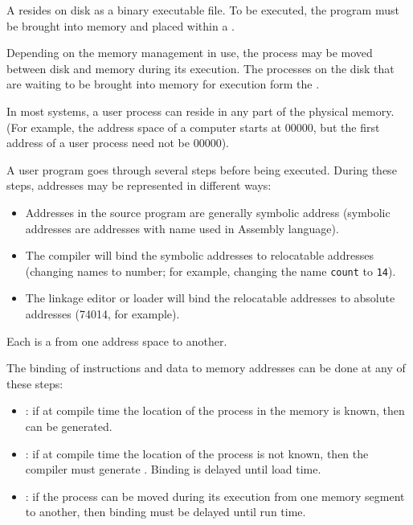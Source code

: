     \par A  resides on disk as a binary executable file. To be executed, the program must be brought into memory and placed within a .
    \par Depending on the memory management in use, the process may be moved between disk and memory during its execution. The processes on the disk that are waiting to be brought into memory for execution form the .
    \par In most systems, a user process can reside in any part of the physical memory. (For example, the address space of a computer starts at 00000, but the first address of a user process need not be 00000).
    \par A user program goes through several steps before being executed. During these steps, addresses may be represented in different ways:
    \begin{itemize}
      \item Addresses in the source program are generally symbolic address (symbolic addresses are addresses with name used in Assembly language).
      \item The compiler will bind the symbolic addresses to relocatable addresses (changing names to number; for example, changing the name \texttt{count} to \texttt{14}).
      \item The linkage editor or loader will bind the relocatable addresses to absolute addresses (74014, for example).
    \end{itemize}
    \par Each  is a  from one address space to another.
    \par The binding of instructions and data to memory addresses can be done at any of these steps:
    \begin{itemize}
      \item {}: if at compile time the location of the process in the memory is known, then  can be generated.
      \item {}: if at compile time the location of the process is not known, then the compiler must generate . Binding is delayed until load time.
      \item {}:  if the process can be moved during its execution from one memory segment to another, then binding must be delayed until run time.
    \end{itemize}

